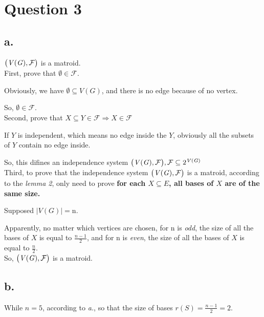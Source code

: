 \documentclass{article}
\begin{document}
\section*{Question 3}{
    \subsection*{a.}{
        \(\big{(}\mathit{V(G)},\mathcal{F}\big{)}\) is a matroid.\\

        First, prove that \(\emptyset \in \mathcal{F}\).

        Obviously, we have \(\emptyset \subseteq \mathit{V(G)}\), and there is no edge because of no vertex. 

        So, \(\emptyset \in \mathcal{F}\).\\

        Second, prove that \(\mathit{X} \subseteq \mathit{Y} \in \mathcal{F} \Rightarrow \mathit{X} \in \mathcal{F}\)

        If \(\mathit{Y}\) is independent, which means no edge inside the \(\mathit{Y}\), obviously all the subsets of \(\mathit{Y}\) contain no edge inside.

        So, this difines an independence system \(\big{(}\mathit{V(G)},\mathcal{F}\big{)}, \mathcal{F} \subseteq \mathrm{2}^{\mathit{V(G)}}\)\\

        Third, to prove that the independence system \(\big{(}\mathit{V(G)},\mathcal{F}\big{)}\) is a matroid, according to the \textit{lemma 2}, only need to prove \textbf{for each \(\mathit{X} \subseteq \mathit{E}\), all bases of \(\mathit{X}\) are of the same size.}

        Supposed \(\lvert \mathit{V(G)} \rvert = \mathrm{n}\). 

        Apparently, no matter which vertices are chosen, for \(\mathrm{n}\) is \textit{odd}, the size of all the bases of \(\mathit{X}\) is equal to \(\frac{\mathit{n}-\mathrm{1}}{\mathrm{2}}\), and for \(\mathrm{n}\) is \textit{even}, the size of all the bases of \(\mathit{X}\) is equal to \(\frac{\mathit{n}}{\mathrm{2}}\).\\

        So, \(\big{(}\mathit{V(G)},\mathcal{F}\big{)}\) is a matroid.
    }
    \subsection*{b.}{
        While \(\mathit{n} = \mathrm{5}\), according to \textit{a.}, so that the size of bases \(\mathit{r(S)} = \frac{\mathit{n}-\mathrm{1}}{\mathrm{2}}=\mathrm{2}\).

}}
\end{document}
